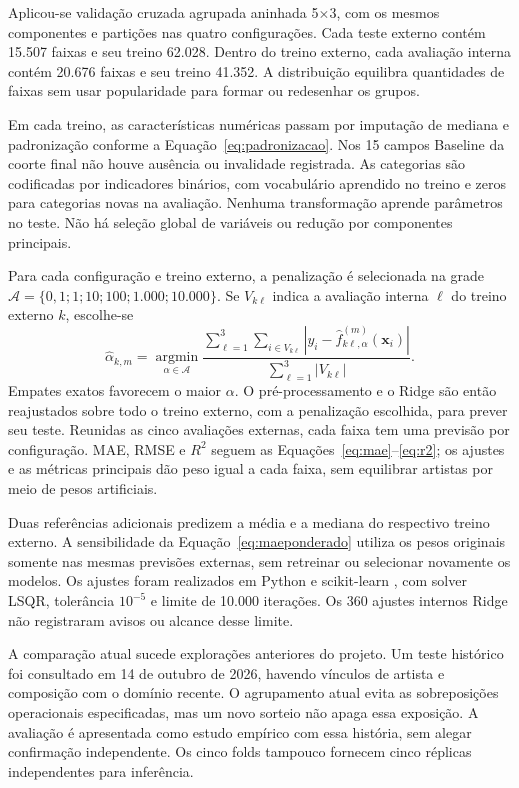 Aplicou-se validação cruzada agrupada aninhada 5$\times$3, com os mesmos componentes e partições nas quatro configurações. Cada teste externo contém 15.507 faixas e seu treino 62.028. Dentro do treino externo, cada avaliação interna contém 20.676 faixas e seu treino 41.352. A distribuição equilibra quantidades de faixas sem usar popularidade para formar ou redesenhar os grupos.

Em cada treino, as características numéricas passam por imputação de mediana e padronização conforme a Equação~\ref{eq:padronizacao}. Nos 15 campos Baseline da coorte final não houve ausência ou invalidade registrada. As categorias são codificadas por indicadores binários, com vocabulário aprendido no treino e zeros para categorias novas na avaliação. Nenhuma transformação aprende parâmetros no teste. Não há seleção global de variáveis ou redução por componentes principais.

Para cada configuração e treino externo, a penalização é selecionada na grade
$\mathcal A=\{0{,}1;1;10;100;1.000;10.000\}$. Se $V_{k\ell}$ indica a avaliação interna $\ell$ do treino externo $k$, escolhe-se
\begin{equation}\label{eq:selecaoalpha}
 \widehat\alpha_{k,m}=\underset{\alpha\in\mathcal A}{\operatorname{argmin}}
 \frac{\sum_{\ell=1}^{3}\sum_{i\in V_{k\ell}}
 |y_i-\widehat f^{(m)}_{k\ell,\alpha}(\bm x_i)|}
 {\sum_{\ell=1}^{3}|V_{k\ell}|}.
\end{equation}
Empates exatos favorecem o maior $\alpha$. O pré-processamento e o Ridge são então reajustados sobre todo o treino externo, com a penalização escolhida, para prever seu teste. Reunidas as cinco avaliações externas, cada faixa tem uma previsão por configuração. MAE, RMSE e $R^2$ seguem as Equações~\ref{eq:mae}--\ref{eq:r2}; os ajustes e as métricas principais dão peso igual a cada faixa, sem equilibrar artistas por meio de pesos artificiais.

Duas referências adicionais predizem a média e a mediana do respectivo treino externo. A sensibilidade da Equação~\ref{eq:maeponderado} utiliza os pesos originais somente nas mesmas previsões externas, sem retreinar ou selecionar novamente os modelos. Os ajustes foram realizados em Python e scikit-learn \cite{pedregosa2011}, com solver LSQR, tolerância $10^{-5}$ e limite de 10.000 iterações. Os 360 ajustes internos Ridge não registraram avisos ou alcance desse limite.

A comparação atual sucede explorações anteriores do projeto. Um teste histórico foi consultado em 14 de outubro de 2026, havendo vínculos de artista e composição com o domínio recente. O agrupamento atual evita as sobreposições operacionais especificadas, mas um novo sorteio não apaga essa exposição. A avaliação é apresentada como estudo empírico com essa história, sem alegar confirmação independente. Os cinco folds tampouco fornecem cinco réplicas independentes para inferência.
